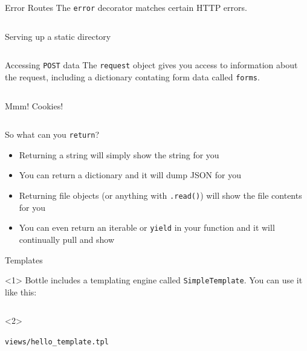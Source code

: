 \documentclass{lug}
\begin{document}
\begin{frame}{Error Routes}
    The \texttt{error} decorator matches certain HTTP errors.

    \medskip

    \inputminted{python3}{examples/route_error.py}
\end{frame}

\begin{frame}{Serving up a static directory}
    \inputminted{python3}{examples/static_files.py}
\end{frame}

\begin{frame}{Accessing \texttt{POST} data}
    The \texttt{request} object gives you access to information about the
    request, including a dictionary contating form data called \texttt{forms}.

    \inputminted{python3}{examples/form_data.py}
\end{frame}

\begin{frame}{Mmm! Cookies!}
    \inputminted{python3}{examples/cookies.py}
\end{frame}

\begin{frame}{So what can you \texttt{return}?}
    \begin{itemize}[<+->]
        \item Returning a string will simply show the string for you
        \item You can return a dictionary and it will dump JSON for you
        \item Returning file objects (or anything with \texttt{.read()}) will
            show the file contents for you
        \item You can even return an iterable or \texttt{yield} in your
            function and it will continually pull and show
    \end{itemize}
\end{frame}

\begin{frame}{Templates}
    \begin{onlyenv}<1>
    Bottle includes a templating engine called \texttt{SimpleTemplate}. You can
    use it like this:
    \end{onlyenv}

    {\small
    \inputminted{python3}{examples/template.py}
    }

    \begin{onlyenv}<2>
    \begin{block}{\texttt{views/hello\_template.tpl}}
        \small
        \inputminted{html}{examples/hello_template.tpl}
    \end{block}
    \end{onlyenv}
\end{frame}
\end{document}
